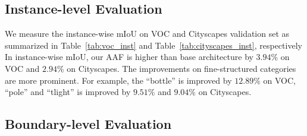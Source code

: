 \subsection{Instance-level Evaluation}
\label{sec:inst_eval}

We measure the instance-wise mIoU on VOC and Cityscapes validation set as summarized in Table~\ref{tab:voc_inst} and Table~\ref{tab:cityscapes_inst}, respectively In instance-wise mIoU, our AAF is higher than base architecture by $3.94\%$ on VOC and $2.94\%$ on Cityscapes. The improvements on fine-structured categories are more prominent. For example, the ``bottle'' is improved by $12.89\%$ on VOC, ``pole'' and ``tlight'' is improved by $9.51\%$ and $9.04\%$ on Cityscapes.


\subsection{Boundary-level Evaluation}
\label{sec:boundary_eval}

\begin{table*}[b!]
  \centering
    \vspace{0.5pt}
    \caption{Per-class boundary recall results on Pascal VOC 2012 validation set.}
    \label{tab:voc_boundary}
\end{table*}

